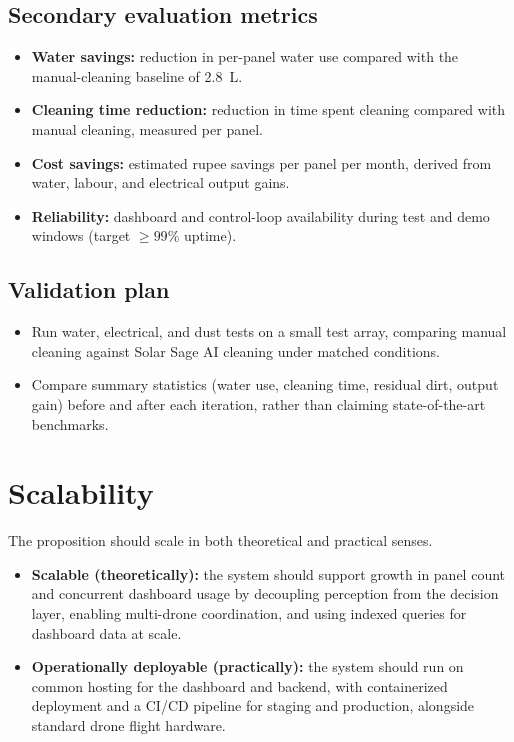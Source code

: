 \documentclass[11pt]{article}
\begin{document}
\subsection{Secondary evaluation metrics}
\begin{itemize}
    \item \textbf{Water savings:} reduction in per-panel water use compared with the manual-cleaning baseline of 2.8~L.
    \item \textbf{Cleaning time reduction:} reduction in time spent cleaning compared with manual cleaning, measured per panel.
    \item \textbf{Cost savings:} estimated rupee savings per panel per month, derived from water, labour, and electrical output gains.
    \item \textbf{Reliability:} dashboard and control-loop availability during test and demo windows (target $\geq 99\%$ uptime).
\end{itemize}

\subsection{Validation plan}
\begin{itemize}
    \item Run water, electrical, and dust tests on a small test array, comparing manual cleaning against Solar Sage AI cleaning under matched conditions.
    \item Compare summary statistics (water use, cleaning time, residual dirt, output gain) before and after each iteration, rather than claiming state-of-the-art benchmarks.
\end{itemize}

\section{Scalability}
The proposition should scale in both theoretical and practical senses.
\begin{itemize}
    \item \textbf{Scalable (theoretically):} the system should support growth in panel count and concurrent dashboard usage by decoupling perception from the decision layer, enabling multi-drone coordination, and using indexed queries for dashboard data at scale.
    \item \textbf{Operationally deployable (practically):} the system should run on common hosting for the dashboard and backend, with containerized deployment and a CI/CD pipeline for staging and production, alongside standard drone flight hardware.
\end{itemize}
\end{document}
